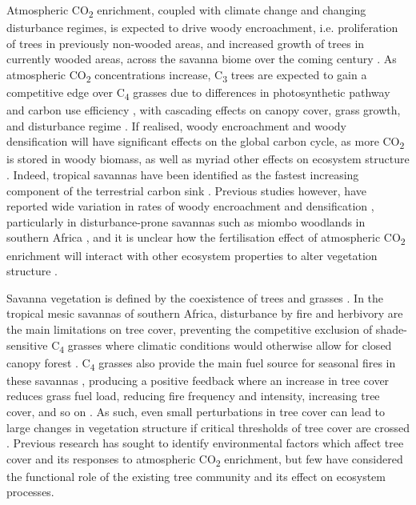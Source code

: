 \documentclass[11pt,a4paper]{article}
\begin{document}
Atmospheric CO\textsubscript{2} enrichment, coupled with climate change and changing disturbance regimes, is expected to drive woody encroachment, i.e. proliferation of trees in previously non-wooded areas, and increased growth of trees in currently wooded areas, across the savanna biome over the coming century \citep{Mitchard2013, Criado2020, Stevens2016}. As atmospheric CO\textsubscript{2} concentrations increase, C\textsubscript{3} trees are expected to gain a competitive edge over C\textsubscript{4} grasses due to differences in photosynthetic pathway and carbon use efficiency \citep{Buitenwerf2012}, with cascading effects on canopy cover, grass growth, and disturbance regime \citep{Bond2012}. If realised, woody encroachment and woody densification will have significant effects on the global carbon cycle, as more CO\textsubscript{2} is stored in woody biomass, as well as myriad other effects on ecosystem structure \citep{Donohue2013}. Indeed, tropical savannas have been identified as the fastest increasing component of the terrestrial carbon sink \citep{Sitch2015}. Previous studies however, have reported wide variation in rates of woody encroachment and densification \citep{Mitchard2013}, particularly in disturbance-prone savannas such as miombo woodlands in southern Africa \citep{Axelsson2018}, and it is unclear how the fertilisation effect of atmospheric CO\textsubscript{2} enrichment will interact with other ecosystem properties to alter vegetation structure \citep{Korner2017, Reich2014}.

Savanna vegetation is defined by the coexistence of trees and grasses \citep{Scholes1997}. In the tropical mesic savannas of southern Africa, disturbance by fire and herbivory are the main limitations on tree cover, preventing the competitive exclusion of shade-sensitive C\textsubscript{4} grasses where climatic conditions would otherwise allow for closed canopy forest \citep{Sankaran2005}. C\textsubscript{4} grasses also provide the main fuel source for seasonal fires in these savannas \citep{Frost1996}, producing a positive feedback where an increase in tree cover reduces grass fuel load, reducing fire frequency and intensity, increasing tree cover, and so on \citep{Staver2015}. As such, even small perturbations in tree cover can lead to large changes in vegetation structure if critical thresholds of tree cover are crossed \citep{Hirota2011}. Previous research has sought to identify environmental factors which affect tree cover and its responses to atmospheric CO\textsubscript{2} enrichment, but few have considered the functional role of the existing tree community and its effect on ecosystem processes.
\end{document}
